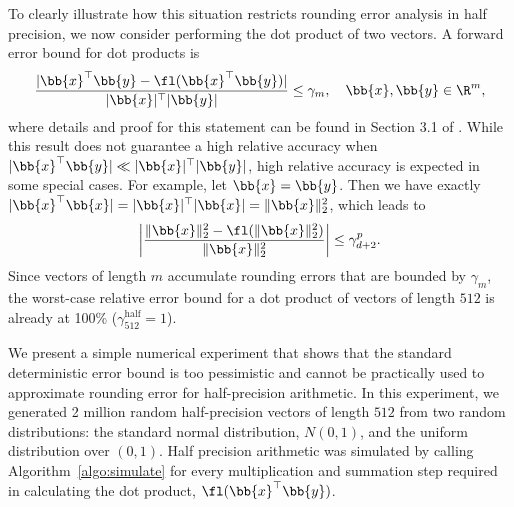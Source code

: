 \par

To clearly illustrate how this situation restricts rounding error analysis in half precision, we now consider performing the dot product of two vectors.
A forward error bound for dot products is
\begin{equation}
\frac{|\bb{x}^{\top}\bb{y} - \fl(\bb{x}^{\top}\bb{y})|}{|\bb{x}|^{\top}|\bb{y}|} \leq \gamma_{m}, \quad \bb{x},\bb{y}\in\R^{m},
\label{eqn:DDerr}
\end{equation}
where details and proof for this statement can be found in Section 3.1 of \cite{Higham2002}.
While this result does not guarantee a high relative accuracy when $|\bb{x}^{\top}\bb{y}| \ll |\bb{x}|^{\top}|\bb{y}|$, high relative accuracy is expected in some special cases.
For example, let $\bb{x}=\bb{y}$.
Then we have exactly $|\bb{x}^{\top}\bb{x}| = |\bb{x}|^{\top}|\bb{x}|=\|\bb{x}\|_2^2$, which leads to
\begin{equation}
\left|\frac{\|\bb{x}\|_2^2 - \fl(\|\bb{x}\|_2^2)}{\|\bb{x}\|_2^2}\right| \leq \gamma^{p}_{d+2}.
\end{equation}
Since vectors of length $m$ accumulate rounding errors that are bounded by $\gamma_{m}$, the worst-case relative error bound for a dot product of vectors of length $512$ is already at 100\% ($\gamma^{\text{half}}_{512}=1$). \par

We present a simple numerical experiment that shows that the standard deterministic error bound is too pessimistic and cannot be practically used to approximate rounding error for half-precision arithmetic. 
In this experiment, we generated 2 million random half-precision vectors of length $512$ from two random distributions: the standard normal distribution, $N(0,1)$, and the uniform distribution over $(0,1)$.
Half precision arithmetic was simulated by calling Algorithm~\ref{algo:simulate} for every multiplication and summation step required in calculating the dot product, $\fl(\bb{x}^{\top}\bb{y})$.


